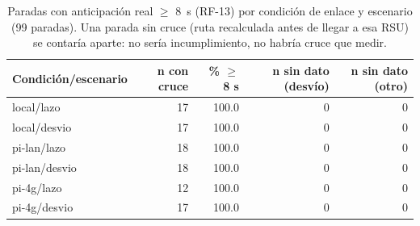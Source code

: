 \begin{table}[H]
\centering
\caption{Paradas con anticipación real $\geq$ 8~s (RF-13) por condición de enlace y escenario (99 paradas). Una parada sin cruce (ruta recalculada antes de llegar a esa RSU) se contaría aparte: no sería incumplimiento, no habría cruce que medir.}
\label{tab:anticipacion_parada}
\small
\begin{tabular}{lrrrr}
\toprule
\textbf{Condición/escenario} & \textbf{n con cruce} & \textbf{\% $\geq$ 8 s} & \textbf{n sin dato (desvío)} & \textbf{n sin dato (otro)} \\
\midrule
local/lazo & 17 & 100.0 & 0 & 0 \\
local/desvio & 17 & 100.0 & 0 & 0 \\
pi-lan/lazo & 18 & 100.0 & 0 & 0 \\
pi-lan/desvio & 18 & 100.0 & 0 & 0 \\
pi-4g/lazo & 12 & 100.0 & 0 & 0 \\
pi-4g/desvio & 17 & 100.0 & 0 & 0 \\
\bottomrule
\end{tabular}
\end{table}
